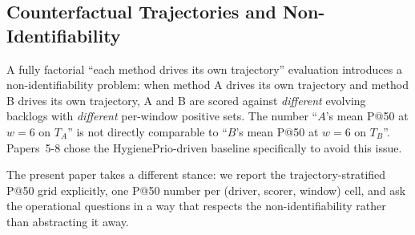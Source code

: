 \subsection{Counterfactual Trajectories and Non-Identifiability}

A fully factorial ``each method drives its own trajectory'' evaluation
introduces a non-identifiability problem: when method A drives its own
trajectory and method B drives its own trajectory, A and B are scored
against \textit{different} evolving backlogs with \textit{different}
per-window positive sets. The number ``$A$'s mean P@50 at $w = 6$ on
$T_A$'' is not directly comparable to ``$B$'s mean P@50 at $w = 6$ on
$T_B$''. Papers~5-8 chose the HygienePrio-driven baseline specifically
to avoid this issue.

The present paper takes a different stance: we report the trajectory-stratified
P@50 grid explicitly, one P@50 number per (driver, scorer, window) cell, 
and ask the operational questions in a way that respects the
non-identifiability rather than abstracting it away.
